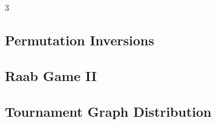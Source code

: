 \documentclass[8pt]{extarticle}
\begin{document}
\begin{multicols*}{3}
\subsection{Permutation Inversions}
\begin{caixaenunciado}

\end{caixaenunciado}
\vspace{0.3cm}


\subsection{Raab Game II}
\begin{caixaenunciado}

\end{caixaenunciado}
\vspace{0.3cm}


\subsection{Tournament Graph Distribution}
\begin{caixaenunciado}

\end{caixaenunciado}
\vspace{0.3cm}

\end{multicols*}
\pagebreak
\end{document}
